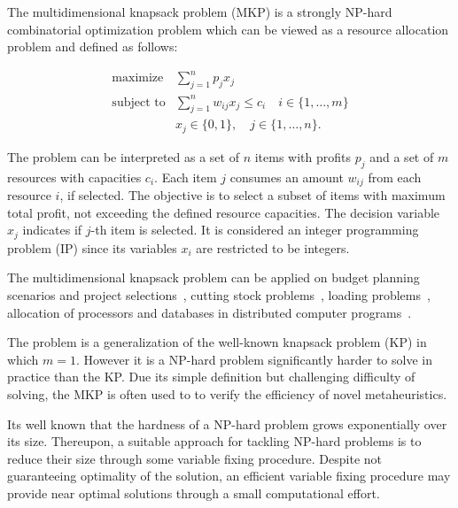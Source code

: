 
The multidimensional knapsack problem (MKP) is a strongly NP-hard combinatorial
optimization problem which can be viewed as a resource allocation problem and
defined as follows:

\begin{align*}
  \text{maximize} & \sum_{j=1}^n p_j x_j \\
  \text{subject to} & \sum_{j=1}^n w_{ij} x_j \leqslant c_i \quad i \in \{1, \ldots, m\}\\
   & x_j \in \{0, 1\}, \quad j \in \{1, \ldots, n\}.
\end{align*}

The problem can be interpreted as a set of $n$ items with profits $p_j$
and a set of $m$ resources with capacities $c_i$.
Each item $j$ consumes an amount $w_{ij}$ from each resource $i$, if selected.
The objective is to select a subset of items with maximum total profit,
not exceeding the defined resource capacities.
The decision variable $x_j$ indicates if $j$-th item is selected.
It is considered an integer programming problem (IP) since its variables $x_i$
are restricted to be integers.

The multidimensional knapsack problem can be applied on budget planning 
scenarios and project selections~\cite{mcmillan1973resource},
cutting stock problems~\cite{Gilmore-Gomory-1966}, loading problems~\cite{Shih-1979},
allocation of processors and databases in distributed computer programs~\cite{Gavish-Pirckul-1982}.

The problem is a generalization of the well-known knapsack problem (KP) in which
$m = 1$.
However it is a NP-hard problem significantly harder to solve in practice than the KP.
Due its simple definition but challenging difficulty of solving, the MKP is often used to
to verify the efficiency of novel metaheuristics.

Its well known that the hardness of a NP-hard problem grows exponentially over
its size.
Thereupon, a suitable approach for tackling NP-hard problems is to reduce their size
through some variable fixing procedure.
Despite not guaranteeing optimality of the solution, an efficient variable
fixing procedure may provide near optimal solutions through a small computational effort.


